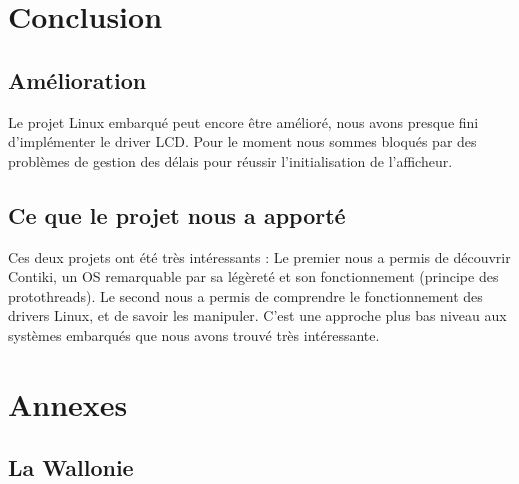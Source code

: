 \documentclass[a4paper,12pt]{article}
\begin{document}
\newpage
\section*{Conclusion}
  
\bigskip
  \subsection*{Amélioration}
  	Le projet Linux embarqué peut encore être amélioré, nous avons presque fini d'implémenter le driver LCD. Pour le moment nous sommes bloqués par des problèmes de gestion des délais pour réussir l'initialisation de l'afficheur.

\bigskip
  \subsection*{Ce que le projet nous a apporté}
  	Ces deux projets ont été très intéressants : Le premier nous a permis de découvrir Contiki, un OS remarquable par sa légèreté et son fonctionnement (principe des protothreads). Le second nous a permis de comprendre le fonctionnement des drivers Linux, et de savoir les manipuler. C'est une approche plus bas niveau aux systèmes embarqués que nous avons trouvé très intéressante. 

\newpage
\section*{Annexes}

  \subsection*{La Wallonie}
\end{document}
